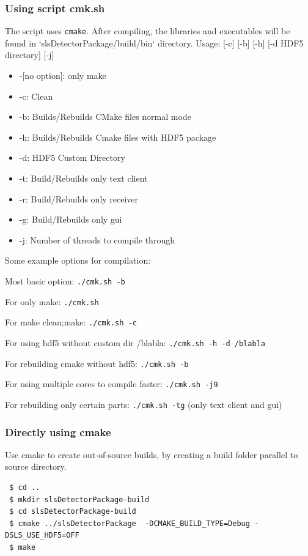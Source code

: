 \documentclass{article}
\begin{document}
\subsubsection{Using script cmk.sh}
The script uses \verb=cmake=. After compiling, the libraries and executables
will be found in `slsDetectorPackage/build/bin` directory.
Usage: [-c] [-b] [-h] [-d HDF5 directory] [-j]
\begin{itemize}
 \item -[no option]: only make
 \item -c: Clean
 \item -b: Builds/Rebuilds CMake files normal mode
 \item -h: Builds/Rebuilds Cmake files with HDF5 package
 \item -d: HDF5 Custom Directory
 \item -t: Build/Rebuilds only text client
 \item -r: Build/Rebuilds only receiver
 \item -g: Build/Rebuilds only gui
 \item -j: Number of threads to compile through
\end{itemize}

Some example options for compilation:

Most basic option: \verb=./cmk.sh -b=

For only make: \verb=./cmk.sh=

For make clean;make: \verb=./cmk.sh -c=

For using hdf5 without custom dir /blabla: \verb=./cmk.sh -h -d /blabla=

For rebuilding cmake without hdf5: \verb=./cmk.sh -b=

For using multiple cores to compile faster: \verb=./cmk.sh -j9=

For rebuilding only certain parts: \verb=./cmk.sh -tg= (only text client and
gui)


\subsubsection{Directly using cmake}

Use cmake to create out-of-source builds, by creating a build folder parallel to
source directory. 
\begin{verbatim}
 $ cd ..
 $ mkdir slsDetectorPackage-build
 $ cd slsDetectorPackage-build
 $ cmake ../slsDetectorPackage  -DCMAKE_BUILD_TYPE=Debug -DSLS_USE_HDF5=OFF 
 $ make
\end{verbatim}
\end{document}
